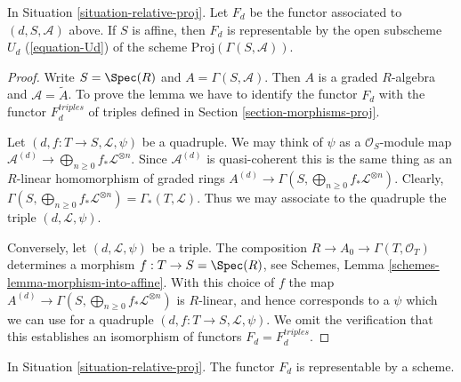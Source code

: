 \begin{lemma}
\label{lemma-relative-proj-affine}
In Situation \ref{situation-relative-proj}. Let $F_d$ be the functor
associated to $(d, S, \mathcal{A})$ above.
If $S$ is affine, then $F_d$ is representable by the open subscheme
$U_d$ (\ref{equation-Ud})
of the scheme $\text{Proj}(\Gamma(S, \mathcal{A}))$.
\end{lemma}

\begin{proof}
Write $S = \Spec(R)$ and $A = \Gamma(S, \mathcal{A})$.
Then $A$ is a graded $R$-algebra and $\mathcal{A} = \widetilde A$.
To prove the lemma we have to identify the functor $F_d$
with the functor $F_d^{triples}$ of triples defined in Section
\ref{section-morphisms-proj}.

\medskip\noindent
Let $(d, f : T \to S, \mathcal{L}, \psi)$ be a quadruple.
We may think of $\psi$ as a $\mathcal{O}_S$-module map
$\mathcal{A}^{(d)} \to \bigoplus_{n \geq 0} f_*\mathcal{L}^{\otimes n}$.
Since $\mathcal{A}^{(d)}$ is quasi-coherent this is the same
thing as an $R$-linear homomorphism of graded rings
$A^{(d)} \to \Gamma(S, \bigoplus_{n \geq 0} f_*\mathcal{L}^{\otimes n})$.
Clearly, $\Gamma(S, \bigoplus_{n \geq 0} f_*\mathcal{L}^{\otimes n}) =
\Gamma_*(T, \mathcal{L})$. Thus we may associate to
the quadruple the triple $(d, \mathcal{L}, \psi)$.

\medskip\noindent
Conversely, let $(d, \mathcal{L}, \psi)$ be a triple.
The composition $R \to A_0 \to \Gamma(T, \mathcal{O}_T)$
determines a morphism $f : T \to S = \Spec(R)$, see
Schemes, Lemma \ref{schemes-lemma-morphism-into-affine}.
With this choice of $f$ the map
$A^{(d)} \to \Gamma(S, \bigoplus_{n \geq 0} f_*\mathcal{L}^{\otimes n})$
is $R$-linear, and hence corresponds to a $\psi$ which we
can use for a quadruple $(d, f : T \to S, \mathcal{L}, \psi)$.
We omit the verification that this establishes an isomorphism
of functors $F_d = F_d^{triples}$.
\end{proof}

\begin{lemma}
\label{lemma-relative-proj-d}
In Situation \ref{situation-relative-proj}.
The functor $F_d$ is representable by a scheme.
\end{lemma}

